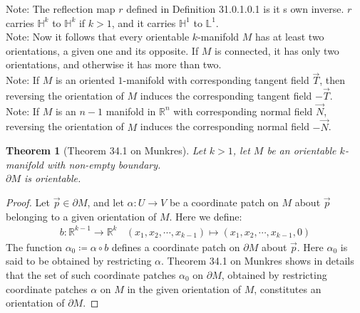 \documentclass[15pt]{book}
\theoremstyle{break}
\theoremstyle{break}
\newtheorem{thm}{Theorem}[section]
\newcommand{\R}{\mathbb{R}}
\newcommand{\note}{\color{red}Note: \color{black}}
\begin{document}
\note The reflection map $r$ defined in Definition 31.0.1.0.1 is it s own inverse. $r$ carries $\mathbb{H}^k$ to $\mathbb{H}^k$ if $k>1$, and it carries $\mathbb{H}^1$ to $\mathbb{L}^1$. \\

\note Now it follows that every orientable $k$-manifold $M$ has at least two orientations, a given one and its opposite. If $M$ is connected, it has only two orientations, and otherwise it has more than two. \\

\note If $M$ is an oriented $1$-manifold with corresponding tangent field $\vec{T}$, then reversing the orientation of $M$ induces the corresponding tangent field $-\vec{T}$.\\

\note If $M$ is an $n-1$ manifold in $\R^n$ with corresponding normal field $\vec{N}$, reversing the orientation of $M$ induces the corresponding normal field $-\vec{N}$. \\
\newpage

\begin{thm}[Theorem 34.1 on Munkres]
Let $k>1$, let $M$ be an orientable $k$-manifold with non-empty boundary. \\
$\partial M$ is orientable.
\end{thm}
\begin{proof}
Let $\vec{p} \in \partial M$, and let $\alpha:U \to V$ be a coordinate patch on $M$ about $\vec{p}$ belonging to a given orientation of $M$. Here we define:
\begin{align*}
b:\R^{k-1}\to \R^k \ \ \ \ (x_1,x_2,\cdots, x_{k-1}) \mapsto (x_1,x_2,\cdots, x_{k-1},0)
\end{align*}
The function $\alpha_0 \coloneqq \alpha\circ b$ defines a coordinate patch on $\partial M$ about $\vec{p}$. Here $\alpha_0$ is said to be obtained by restricting $\alpha$. Theorem 34.1 on Munkres shows in details that the set of such coordinate patches $\alpha_0$ on $\partial M$, obtained by restricting coordinate patches $\alpha$ on $M$ in the given orientation of $M$, constitutes an orientation of $\partial M$. 
\end{proof}
\end{document}
